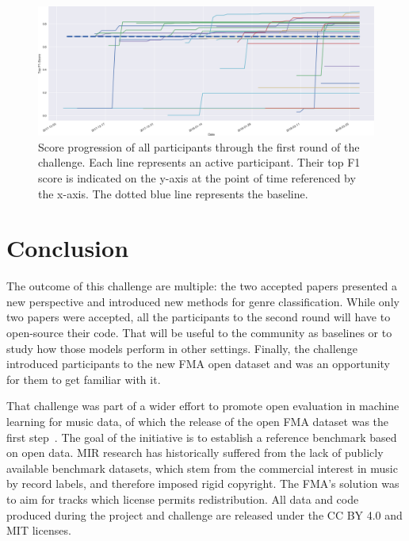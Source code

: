 \documentclass[sigconf]{acmart}
\begin{document}

\begin{figure}[t]
\centering
\includegraphics[width=\linewidth]{images/plot-2}
\caption{Score progression of all participants through the first round of the challenge. Each line represents an active participant. Their top F1 score is indicated on the y-axis at the point of time referenced by the x-axis. The dotted blue line represents the baseline.}
\label{fig:timeline}
\end{figure}

\section{Conclusion}

The outcome of this challenge are multiple: the two accepted papers presented a new perspective and introduced new methods for genre classification. While only two papers were accepted, all the participants to the second round will have to open-source their code. That will be useful to the community as baselines or to study how those models perform in other settings. Finally, the challenge introduced participants to the new FMA open dataset and was an opportunity for them to get familiar with it.

That challenge was part of a wider effort to promote open evaluation in machine learning for music data, of which the release of the open FMA dataset was the first step~\cite{fma_dataset}. The goal of the initiative is to establish a reference benchmark based on open data. MIR research has historically suffered from the lack of publicly available benchmark datasets, which stem from the commercial interest in music by record labels, and therefore imposed rigid copyright. The FMA's solution was to aim for tracks which license permits redistribution. All data and code produced during the project and challenge are released under the CC BY 4.0 and MIT licenses.




\end{document}
